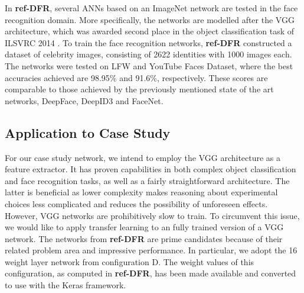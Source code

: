 \noindent In \textbf{ref-DFR}, several ANNs based on an ImageNet network are tested in the face recognition domain. More specifically, the networks are modelled after the VGG architecture, which was awarded second place in the object classification task of ILSVRC 2014 \cite{vgg}. To train the face recognition networks, \textbf{ref-DFR} constructed a dataset of celebrity images, consisting of 2622 identities with 1000 images each. The networks were tested on LFW and YouTube Faces Dataset, where the best accuracies achieved are 98.95\% and 91.6\%, respectively. These scores are comparable to those achieved by the previously mentioned state of the art networks, DeepFace, DeepID3 and FaceNet.

\subsection{Application to Case Study} \label{sec:vggface-application}

For our case study network, we intend to employ the VGG architecture as a feature extractor. It has proven capabilities in both complex object classification and face recognition tasks, as well as a fairly straightforward architecture. The latter is beneficial as lower complexity makes reasoning about experimental choices less complicated and reduces the possibility of unforeseen effects. However, VGG networks are prohibitively slow to train. To circumvent this issue, we would like to apply transfer learning to an fully trained version of a VGG network. The networks from \textbf{ref-DFR} are prime candidates because of their related problem area and impressive performance. In particular, we adopt the 16 weight layer network from configuration D. The weight values of this configuration, as computed in \textbf{ref-DFR}, has been made available and converted to use with the Keras framework.


\cleardoublepage